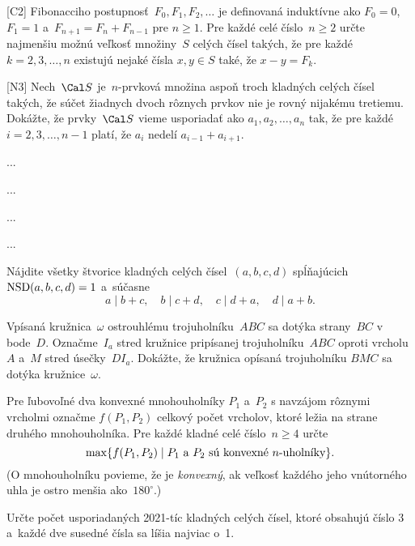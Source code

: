 {%
[C2]
Fibonacciho postupnosť~$F_0,F_1,F_2,\ldots$ je definovaná induktívne ako $F_0=0$, $F_1=1$ a~$F_{n+1}=F_{n}+F_{n-1}$ pre $n \ge 1$. Pre každé celé číslo~$n \ge 2$ určte najmenšiu možnú veľkosť množiny~$S$ celých čísel takých, že pre každé $k=2,3,\ldots,n$ existujú nejaké čísla $x,y \in S$ také, že $x-y=F_k$.
}

{%
[N3]
Nech~${\Cal S}$ je~$n$-prvková množina aspoň troch kladných celých čísel takých, že súčet žiadnych dvoch rôznych prvkov nie je rovný nijakému tretiemu. Dokážte, že prvky~${\Cal S}$ vieme usporiadať ako $a_1,a_2,\ldots,a_n$ tak, že pre každé $i=2,3,\ldots,n-1$ platí, že $a_i$ nedelí $a_{i-1}+a_{i+1}$.
}

{%
...}

{%
...}

{%
...}

{%
...}

{%
Nájdite všetky štvorice kladných celých čísel~$(a, b, c, d)$ spĺňajúcich $\hbox{NSD}(a, b, c, d) = 1$ a~súčasne
$$
a \mid b + c,\quad
b \mid c + d,\quad
c \mid d + a,\quad
d \mid a + b.
$$
}

{%
Vpísaná kružnica~$\omega$ ostrouhlému trojuholníku~$ABC$ sa dotýka strany~$BC$ v bode~$D$. Označme~$I_a$ stred kružnice pripísanej trojuholníku~$ABC$ oproti vrcholu~$A$ a~$M$ stred úsečky~$DI_a$. Dokážte, že kružnica opísaná trojuholníku $BMC$ sa dotýka kružnice~$\omega$.
}

{%
Pre ľubovoľné dva konvexné mnohouholníky $P_1$ a~$P_2$ s navzájom rôznymi vrcholmi označme $f(P_1, P_2)$ celkový počet vrcholov, ktoré ležia na strane druhého mnohouholníka. Pre každé kladné celé číslo~$n \ge 4$ určte
$$
\max\{ f(P_1, P_2) \mid
       \hbox{$P_1$ a $P_2$ sú konvexné $n$-uholníky}
    \}.
$$
(O mnohouholníku povieme, že je {\it konvexný}, ak veľkosť každého jeho vnútorného uhla je ostro menšia ako~$180^\circ$.)
}

{%
Určte počet usporiadaných 2021-tíc kladných celých čísel, ktoré obsahujú číslo $3$ a~každé dve susedné čísla sa líšia najviac o~1.
}

